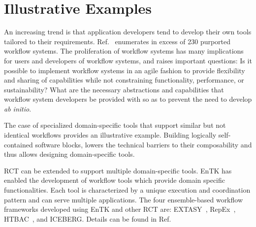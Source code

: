 \documentclass[preprint,12pt, a4paper]{elsarticle}
\begin{document}


\section{Illustrative Examples}\label{sec:examples}


An increasing trend is that application developers tend to develop their own
tools tailored to their requirements. Ref.~\cite{workflow-systems-url}
enumerates in excess of 230 purported workflow systems. The proliferation of
workflow systems has many implications for users and developers of workflow
systems, and raises important questions: Is it possible to implement workflow
systems in an agile fashion to provide flexibility and sharing of capabilities
while not constraining functionality, performance, or sustainability? What are
the necessary abstractions and capabilities that workflow system developers be
provided with so as to prevent the need to develop \textit{ab initio}.




The case of specialized domain-specific tools that support similar but not
identical workflows provides an illustrative example. Building logically
self-contained software blocks, lowers the technical barriers to their
composability and thus allows designing domain-specific tools.

RCT can be extended to support multiple domain-specific tools. EnTK has
enabled the development of workflow tools which provide domain specific
functionalities. Each tool is characterized by a unique execution and
coordination pattern and can serve multiple applications. The four
ensemble-based workflow frameworks developed using EnTK and other RCT are:
EXTASY~\cite{balasubramanian2016extasy}, RepEx~\cite{treikalis2016repex},
HTBAC~\cite{dakka2018high}, and ICEBERG\@. Details can be found in
Ref.~\citep{turilli2019middleware}
\end{document}

